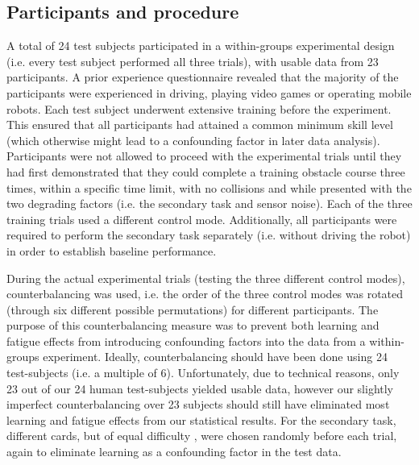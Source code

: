 \documentclass[a4paper,12pt,oneside,openright]{bhamthesis}
\begin{document}
\subsection{Participants and procedure}
A total of 24 test subjects participated in a within-groups experimental design (i.e. every test subject performed all three trials), with usable data from 23 participants. A prior experience questionnaire revealed that the majority of the participants were experienced in driving, playing video games or operating mobile robots. Each test subject underwent extensive training before the experiment. This ensured that all participants had attained a common minimum skill level (which otherwise might lead to a confounding factor in later data analysis). Participants were not allowed to proceed with the experimental trials until they had first demonstrated that they could complete a training obstacle course three times, within a specific time limit, with no collisions and while presented with the two degrading factors (i.e. the secondary task and sensor noise). Each of the three training trials used a different control mode. Additionally, all participants were required to perform the secondary task separately (i.e. without driving the robot) in order to establish baseline performance.

During the actual experimental trials (testing the three different control modes), counterbalancing was used, i.e. the order of the three control modes was rotated (through six different possible permutations) for different participants. The purpose of this counterbalancing measure was to prevent both learning and fatigue effects from introducing confounding factors into the data from a within-groups experiment. Ideally, counterbalancing should have been done using 24 test-subjects (i.e. a multiple of 6). Unfortunately, due to technical reasons, only 23 out of our 24 human test-subjects yielded usable data, however our slightly imperfect counterbalancing over 23 subjects should still have eliminated most learning and fatigue effects from our statistical results. For the secondary task, different cards, but of equal difficulty \citep{Ganis2015}, were chosen randomly before each trial, again to eliminate learning as a confounding factor in the test data. 
\end{document}
